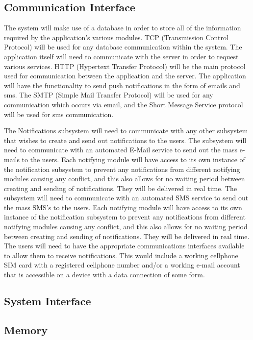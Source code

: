 \documentclass{article}
\begin{document}
\subsection{Communication Interface}

The system will make use of a database in order to store all of the information required by the application's various modules. TCP (Transmission Control Protocol) will be used for any database communication within the system. The application itself will need to communicate with the server in order to request various services. HTTP (Hypertext Transfer Protocol) will be the main protocol used for communication between the application and the server. The application will have the functionality to send push notifications in the form of emails and sms. The SMTP (Simple Mail Transfer Protocol) will be used for any communication which occurs via email, and the Short Message Service protocol will be used for sms communication.


The Notifications subsystem will need to communicate with any other subsystem that wishes to create and send out notifications to the users.
The subsystem will need to communicate with an automated E-Mail service to send out the mass e-mails to the users. Each notifying module will have access to its own instance of the notification subsystem to prevent any notifications from different notifying modules causing any conflict, and this also allows for no waiting period between creating and sending of notifications. They will be delivered in real time.
The subsystem will need to communicate with an automated SMS service to send out the mass SMS's to the users. Each notifying module will have access to its own instance of the notification subsystem to prevent any notifications from different notifying modules causing any conflict, and this also allows for no waiting period between creating and sending of notifications. They will be delivered in real time.
The users will need to have the appropriate communications interfaces available to allow them to receive notifications. This would include a working cellphone SIM card with a registered cellphone number and/or a working e-mail account that is accessible on a device with a data connection of some form.

\subsection{System Interface}

\subsection{Memory}
\end{document}
